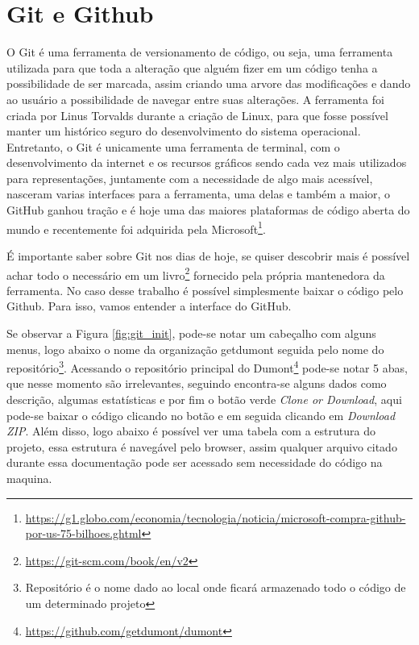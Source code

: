 \chapter{Git e Github}
\label{app:git}
O Git é uma ferramenta de versionamento de código, ou seja, uma ferramenta utilizada para que toda a alteração que alguém fizer em um código tenha a possibilidade de ser marcada, assim criando uma arvore das modificações e dando ao usuário a possibilidade de navegar entre suas alterações. A ferramenta foi criada por Linus Torvalds durante a criação de Linux, para que fosse possível manter um histórico seguro do desenvolvimento do sistema operacional. Entretanto, o Git é unicamente uma ferramenta de terminal, com o desenvolvimento da internet e os recursos gráficos sendo cada vez mais utilizados para representações, juntamente com a necessidade de algo mais acessível, nasceram varias interfaces para a ferramenta, uma delas e também a maior, o GitHub ganhou tração e é hoje uma das maiores plataformas de código aberta do mundo e recentemente foi adquirida pela Microsoft\footnote{\url{https://g1.globo.com/economia/tecnologia/noticia/microsoft-compra-github-por-us-75-bilhoes.ghtml}}.

É importante saber sobre Git nos dias de hoje, se quiser descobrir mais é possível achar todo o necessário em um livro\footnote{\url{https://git-scm.com/book/en/v2}} fornecido pela própria mantenedora da ferramenta. No caso desse trabalho é possível simplesmente baixar o código pelo Github. Para isso, vamos entender a interface do GitHub.

Se observar a Figura \ref{fig:git_init}, pode-se notar um cabeçalho com alguns menus, logo abaixo o nome da organização getdumont seguida pelo nome do repositório\footnote{Repositório é o nome dado ao local onde ficará armazenado todo o código de um determinado projeto}. Acessando o repositório principal do Dumont\footnote{\url{https://github.com/getdumont/dumont}} pode-se notar 5 abas, que nesse momento são irrelevantes, seguindo encontra-se alguns dados como descrição, algumas estatísticas e por fim o botão verde \textit{Clone or Download}, aqui pode-se baixar o código clicando no botão e em seguida clicando em \textit{Download ZIP}. Além disso, logo abaixo é possível ver uma tabela com a estrutura do projeto, essa estrutura é navegável pelo browser, assim qualquer arquivo citado durante essa documentação pode ser acessado sem necessidade do código na maquina.

